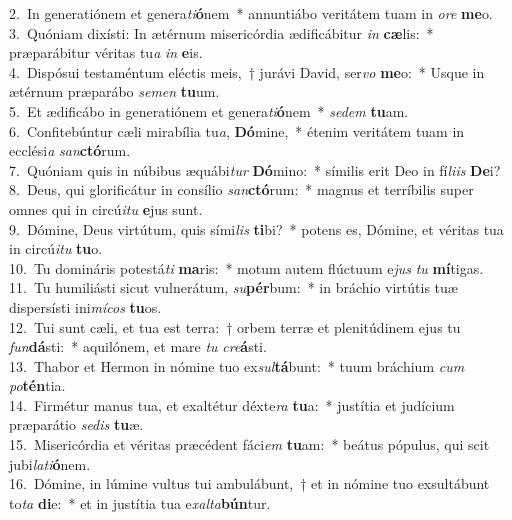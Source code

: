 {2.~}In generatiónem et genera\textit{ti}\textbf{ó}nem~* annuntiábo veritátem tuam in \textit{o}\textit{re} \textbf{me}o.\\
{3.~}Quóniam dixísti: In ætérnum misericórdia ædificábitur \textit{in} \textbf{cæ}lis:~* præparábitur véritas tu\textit{a} \textit{in} \textbf{e}is.\\
{4.~}Dispósui testaméntum eléctis meis,~† jurávi David, ser\textit{vo} \textbf{me}o:~* Usque in ætérnum præparábo \textit{se}\textit{men} \textbf{tu}um.\\
{5.~}Et ædificábo in generatiónem et genera\textit{ti}\textbf{ó}nem~* \textit{se}\textit{dem} \textbf{tu}am.\\
{6.~}Confitebúntur cæli mirabília tu\textit{a}, \textbf{Dó}mine,~* étenim veritátem tuam in ecclési\textit{a} \textit{san}\textbf{ctó}rum.\\
{7.~}Quóniam quis in núbibus æquábi\textit{tur} \textbf{Dó}mino:~* símilis erit Deo in fí\textit{li}\textit{is} \textbf{De}i?\\
{8.~}Deus, qui glorificátur in consílio \textit{san}\textbf{ctó}rum:~* magnus et terríbilis super omnes qui in circú\textit{i}\textit{tu} \textbf{e}jus sunt.\\
{9.~}Dómine, Deus virtútum, quis sími\textit{lis} \textbf{ti}bi?~* potens es, Dómine, et véritas tua in circú\textit{i}\textit{tu} \textbf{tu}o.\\
{10.~}Tu domináris potestá\textit{ti} \textbf{ma}ris:~* motum autem flúctuum e\textit{jus} \textit{tu} \textbf{mí}tigas.\\
{11.~}Tu humiliásti sicut vulnerátum, \textit{su}\textbf{pér}bum:~* in bráchio virtútis tuæ dispersísti ini\textit{mí}\textit{cos} \textbf{tu}os.\\
{12.~}Tui sunt cæli, et tua est terra:~† orbem terræ et plenitúdinem ejus tu \textit{fun}\textbf{dá}sti:~* aquilónem, et mare \textit{tu} \textit{cre}\textbf{á}sti.\\
{13.~}Thabor et Hermon in nómine tuo ex\textit{sul}\textbf{tá}bunt:~* tuum bráchium \textit{cum} \textit{po}\textbf{tén}tia.\\
{14.~}Firmétur manus tua, et exaltétur déxte\textit{ra} \textbf{tu}a:~* justítia et judícium præparátio \textit{se}\textit{dis} \textbf{tu}æ.\\
{15.~}Misericórdia et véritas præcédent fáci\textit{em} \textbf{tu}am:~* beátus pópulus, qui scit jubi\textit{la}\textit{ti}\textbf{ó}nem.\\
{16.~}Dómine, in lúmine vultus tui ambulábunt,~† et in nómine tuo exsultábunt to\textit{ta} \textbf{di}e:~* et in justítia tua e\textit{xal}\textit{ta}\textbf{bún}tur.\\
